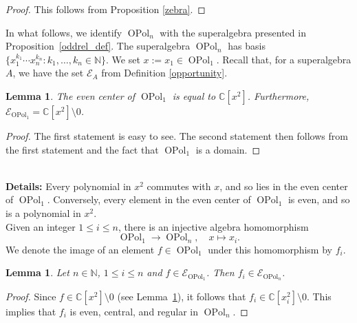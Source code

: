 \documentclass[11pt]{amsart}
\newcommand{\details}[1]{
      \ \\
      {\color{OliveGreen}
        \textbf{Details:} #1
      }
      \\
  }
\newcommand{\details}[1]{}
\newtheorem{lem}[theo]{Lemma}
\theoremstyle{definition}
\numberwithin{equation}{section}
\begin{document}
\begin{proof}
This follows from Proposition \ref{zebra}.
\end{proof}

In what follows, we identify $ \operatorname{OPol}_{n} $ with the superalgebra presented in Proposition~\ref{oddrel_def}. The superalgebra $ \operatorname{OPol}_{n} $ has basis $ \{x_{1}^{k_{1}}\cdots x_{n}^{k_{n}} : k_{1},\ldots, k_{n} \in \mathbb{N}\} $. We set $ x := x_{1} \in \operatorname{OPol}_{1} $. Recall that, for a superalgebra \(A\), we have the set $ \mathcal{E}_{A} $ from Definition \ref{opportunity}.

\begin{lem} \label{sitting}
The even center of $ \operatorname{OPol}_{1} $ is equal to $ \mathbb{C}[x^{2}] $. Furthermore, $ \mathcal{E}_{\operatorname{OPol}_{1}} = \mathbb{C}[x^{2}] \setminus 0 $.
\end{lem}

\begin{proof}
The first statement is easy to see. The second statement then follows from the first statement and the fact that $ \operatorname{OPol}_{1} $ is a domain.
\end{proof}

\details{Every polynomial in $ x^{2} $ commutes with \(x\), and so lies in the even center of $ \operatorname{OPol}_{1} $. Conversely, every element in the even center of $ \operatorname{OPol}_{1} $ is even, and so is a polynomial in $ x^{2} $.}


Given an integer $ 1 \leq i \leq n $, there is an injective algebra homomorphism
\begin{equation} \label{homomorphism_in}
\operatorname{OPol}_{1} \rightarrow \operatorname{OPol}_{n}, \quad  x \mapsto x_{i}.
\end{equation}
We denote the image of an element $ f \in \operatorname{OPol}_{1} $ under this homomorphism by $ f_{i} $.


\begin{lem} \label{uncharted5678_1256}
Let $ n \in \mathbb{N} $, $ 1 \leq i \leq n $ and $ f \in \mathcal{E}_{\operatorname{OPol}_{1}} $. Then $ f_{i} \in \mathcal{E}_{\operatorname{OPol}_{n}} $.
\end{lem}

\begin{proof}
Since $ f \in \mathbb{C}[x^{2}] \setminus 0 $ (see Lemma~\ref{sitting}), it follows that $ f_{i} \in \mathbb{C}[x_{i}^{2}] \setminus 0 $. This implies that $ f_{i} $ is even, central, and regular in $ \operatorname{OPol}_{n} $.
\end{proof}
\end{document}
